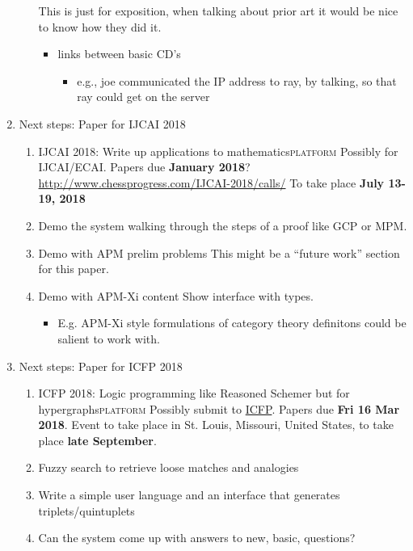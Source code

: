 \documentclass[11pt]{article}
\begin{document}
\begin{enumerate}
\begin{enumerate}
This is just for exposition, when talking about prior art it would be nice to know how they did it.

\begin{itemize}
\item links between basic CD's
\begin{itemize}
\item e.g., joe communicated the IP address to ray, by talking, so that ray could get on the server
\end{itemize}
\end{itemize}
\end{enumerate}

\item Next steps: Paper for IJCAI 2018
\label{sec:org0bd9946}
\begin{enumerate}
\item IJCAI 2018: Write up applications to mathematics\hfill{}\textsc{platform}
\label{sec:orga263659}
Possibly for IJCAI/ECAI.
Papers due \textbf{January 2018}? \url{http://www.chessprogress.com/IJCAI-2018/calls/}
To take place \textbf{July 13-19, 2018}
\item Demo the system walking through the steps of a proof like GCP or MPM.
\label{sec:org1880254}
\item Demo with APM prelim problems
\label{sec:org65051d4}
This might be a ``future work'' section for this paper.
\item Demo with APM-Xi content
\label{sec:org9968015}
Show interface with types.
\begin{itemize}
\item E.g. APM-Xi style formulations of category theory definitons could be salient to work with.
\end{itemize}
\end{enumerate}

\item Next steps: Paper for ICFP 2018
\label{sec:org64974c7}
\begin{enumerate}
\item ICFP 2018: Logic programming like Reasoned Schemer but for hypergraphs\hfill{}\textsc{platform}
\label{sec:org832cee9}
Possibly submit to \href{http://conf.researchr.org/home/icfp-2018}{ICFP}. Papers due \textbf{Fri 16 Mar 2018}.
Event to take place in St. Louis, Missouri, United States, to take place \textbf{late September}.
\item Fuzzy search to retrieve loose matches and analogies
\label{sec:orge1d6d8c}
\item Write a simple user language and an interface that generates triplets/quintuplets
\label{sec:org064fdd7}
\item Can the system come up with answers to new, basic, questions?
\label{sec:org5bb06f3}


\end{enumerate}
\end{enumerate}
\end{document}
